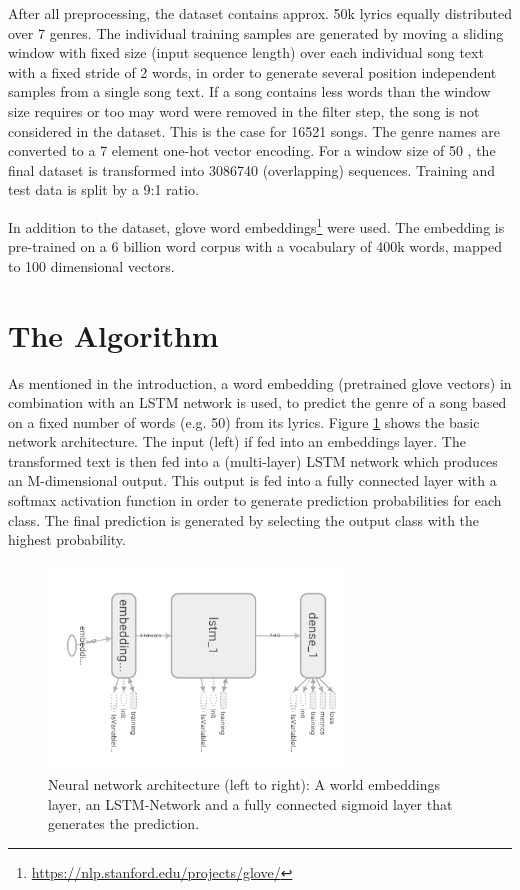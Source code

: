 \documentclass[12pt]{article}
\begin{document}
After all preprocessing, the dataset contains approx. 50k lyrics equally distributed over 7 genres. The individual training samples are generated by moving a sliding window with fixed size (input sequence length) over each individual song text with a fixed stride of 2 words, in order to generate several position independent samples from a single song text. If a song contains less words than the window size requires or too may word were removed in the filter step, the song is not considered in the dataset. This is the case for 16521 songs. The genre names are converted to a 7 element one-hot vector encoding. For a window size of 50 , the final dataset is transformed into 3086740 (overlapping) sequences. Training and test data is split by a 9:1 ratio.

In addition to the dataset, glove word embeddings\footnote{\url{https://nlp.stanford.edu/projects/glove/}} were used. The embedding is pre-trained on a 6 billion word corpus with a vocabulary of 400k words, mapped to 100 dimensional vectors.

\section{The Algorithm}
As mentioned in the introduction, a word embedding (pretrained glove vectors) in combination with an LSTM network is used, to predict the genre of a song based on a fixed number of words (e.g. 50) from its lyrics. Figure \ref{fig:network1} shows the basic network architecture. The input (left) if fed into an embeddings layer. The transformed text is then fed into a (multi-layer) LSTM network which produces an M-dimensional output. This output is fed into a fully connected layer with a softmax activation function in order to generate prediction probabilities for each class. The final prediction is generated by selecting the output class with the highest probability.

\begin{figure}
	\centering
	\includegraphics[width=0.7\textwidth]{img/network_simple.png}
	\caption{Neural network architecture (left to right): A world embeddings layer, an LSTM-Network and a fully connected sigmoid layer that generates the prediction.}
	\label{fig:network1}
\end{figure}
\end{document}
